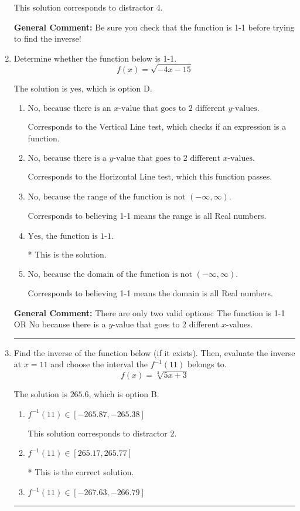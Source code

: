 \documentclass{extbook}[14pt]
\newcommand{\litem}[1]{\item #1

\rule{\textwidth}{0.4pt}}
\begin{document}
\begin{enumerate}
{\begin{enumerate}[label=\Alph*.]
 This solution corresponds to distractor 4.
\end{enumerate}

\textbf{General Comment:} Be sure you check that the function is 1-1 before trying to find the inverse!
}
\litem{
Determine whether the function below is 1-1.
\[ f(x) = \sqrt{-4 x - 15} \]

The solution is \( \text{yes} \), which is option D.\begin{enumerate}[label=\Alph*.]
\item \( \text{No, because there is an $x$-value that goes to 2 different $y$-values.} \)

Corresponds to the Vertical Line test, which checks if an expression is a function.
\item \( \text{No, because there is a $y$-value that goes to 2 different $x$-values.} \)

Corresponds to the Horizontal Line test, which this function passes.
\item \( \text{No, because the range of the function is not $(-\infty, \infty)$.} \)

Corresponds to believing 1-1 means the range is all Real numbers.
\item \( \text{Yes, the function is 1-1.} \)

* This is the solution.
\item \( \text{No, because the domain of the function is not $(-\infty, \infty)$.} \)

Corresponds to believing 1-1 means the domain is all Real numbers.
\end{enumerate}

\textbf{General Comment:} There are only two valid options: The function is 1-1 OR No because there is a $y$-value that goes to 2 different $x$-values.
}
\litem{
Find the inverse of the function below (if it exists). Then, evaluate the inverse at $x = 11$ and choose the interval the $f^{-1}(11)$ belongs to.
\[ f(x) = \sqrt[3]{5 x + 3} \]

The solution is \( 265.6 \), which is option B.\begin{enumerate}[label=\Alph*.]
\item \( f^{-1}(11) \in [-265.87, -265.38] \)

 This solution corresponds to distractor 2.
\item \( f^{-1}(11) \in [265.17, 265.77] \)

* This is the correct solution.
\item \( f^{-1}(11) \in [-267.63, -266.79] \)


\end{enumerate}}
\end{enumerate}
\end{document}
